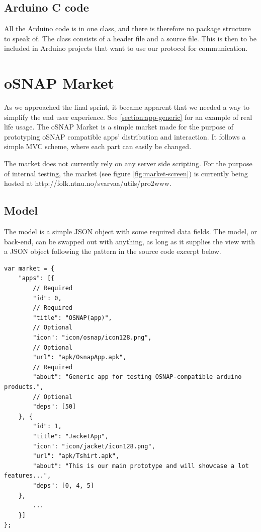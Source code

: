 \subsection{Arduino C code}
All the Arduino code is in one class, and there is therefore no package structure to speak of.
The class consists of a header file and a source file. This is then to be included in Arduino projects
that want to use our protocol for communication.

\section{oSNAP Market}
As we approached the final sprint, it became apparent that we needed a way to simplify the end user experience. See \ref{section:app-generic} for an example of real life usage. The oSNAP Market is a simple market made for the purpose of prototyping oSNAP compatible apps' distribution and interaction. It follows a simple MVC scheme, where each part can easily be changed.

The market does not currently rely on any server side scripting. For the purpose of internal testing, the market (see figure \ref{fig:market-screen}) is currently being hosted at \newline http://folk.ntnu.no/svarvaa/utils/pro2www.

\subsection{Model}
The model is a simple JSON object with some required data fields. The model, or back-end, can be swapped out with anything, as long as it supplies the view with a JSON object following the pattern in the source code excerpt below.
\javacode
\begin{lstlisting}
var market = {
    "apps": [{
        // Required
        "id": 0,
        // Required
        "title": "OSNAP(app)",
        // Optional
        "icon": "icon/osnap/icon128.png",
        // Optional
        "url": "apk/OsnapApp.apk",
        // Required
        "about": "Generic app for testing OSNAP-compatible arduino products.",
        // Optional
        "deps": [50]
    }, {
        "id": 1,
        "title": "JacketApp",
        "icon": "icon/jacket/icon128.png",
        "url": "apk/Tshirt.apk",
        "about": "This is our main prototype and will showcase a lot features...",
        "deps": [0, 4, 5]
    },
        ...
    }]
};
\end{lstlisting}

